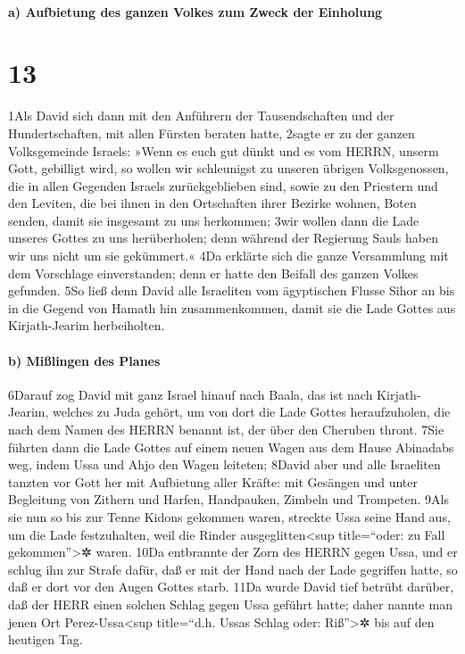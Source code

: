 \hypertarget{a-aufbietung-des-ganzen-volkes-zum-zweck-der-einholung}{%
\paragraph{a) Aufbietung des ganzen Volkes zum Zweck der
Einholung}\label{a-aufbietung-des-ganzen-volkes-zum-zweck-der-einholung}}

\hypertarget{section-12}{%
\section{13}\label{section-12}}

1Als David sich dann mit den Anführern der Tausendschaften und der
Hundertschaften, mit allen Fürsten beraten hatte, 2sagte er zu der
ganzen Volksgemeinde Israels: »Wenn es euch gut dünkt und es vom HERRN,
unserm Gott, gebilligt wird, so wollen wir schleunigst zu unseren
übrigen Volksgenossen, die in allen Gegenden Israels zurückgeblieben
sind, sowie zu den Priestern und den Leviten, die bei ihnen in den
Ortschaften ihrer Bezirke wohnen, Boten senden, damit sie insgesamt zu
uns herkommen; 3wir wollen dann die Lade unseres Gottes zu uns
herüberholen; denn während der Regierung Sauls haben wir uns nicht um
sie gekümmert.« 4Da erklärte sich die ganze Versammlung mit dem
Vorschlage einverstanden; denn er hatte den Beifall des ganzen Volkes
gefunden. 5So ließ denn David alle Israeliten vom ägyptischen Flusse
Sihor an bis in die Gegend von Hamath hin zusammenkommen, damit sie die
Lade Gottes aus Kirjath-Jearim herbeiholten.

\hypertarget{b-miuxdflingen-des-planes}{%
\paragraph{b) Mißlingen des Planes}\label{b-miuxdflingen-des-planes}}

6Darauf zog David mit ganz Israel hinauf nach Baala, das ist nach
Kirjath-Jearim, welches zu Juda gehört, um von dort die Lade Gottes
heraufzuholen, die nach dem Namen des HERRN benannt ist, der über den
Cheruben thront. 7Sie führten dann die Lade Gottes auf einem neuen Wagen
aus dem Hause Abinadabs weg, indem Ussa und Ahjo den Wagen leiteten;
8David aber und alle Israeliten tanzten vor Gott her mit Aufbietung
aller Kräfte: mit Gesängen und unter Begleitung von Zithern und Harfen,
Handpauken, Zimbeln und Trompeten. 9Als sie nun so bis zur Tenne Kidons
gekommen waren, streckte Ussa seine Hand aus, um die Lade festzuhalten,
weil die Rinder ausgeglitten\textless sup title=``oder: zu Fall
gekommen''\textgreater✲ waren. 10Da entbrannte der Zorn des HERRN gegen
Ussa, und er schlug ihn zur Strafe dafür, daß er mit der Hand nach der
Lade gegriffen hatte, so daß er dort vor den Augen Gottes starb. 11Da
wurde David tief betrübt darüber, daß der HERR einen solchen Schlag
gegen Ussa geführt hatte; daher nannte man jenen Ort
Perez-Ussa\textless sup title=``d.h. Ussas Schlag oder:
Riß''\textgreater✲ bis auf den heutigen Tag.

